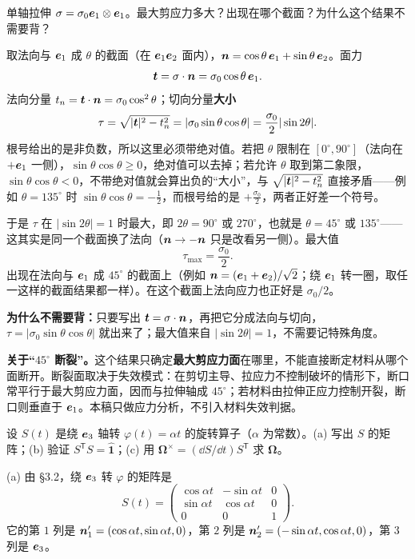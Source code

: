 \documentclass[11pt]{ctexart}
\newcommand{\ten}[1]{\mathbf{#1}}
\newcommand{\unitd}{\hat{\ten{1}}}
\begin{document}
{单轴拉伸 $\ten\sigma=\sigma_0\vect e_1\otimes\vect e_1$。最大剪应力多大？出现在哪个截面？为什么这个结果不需要背？}

取法向与 $\boldsymbol{e}_1$ 成 $\theta$ 的截面（在 $\boldsymbol{e}_1\boldsymbol{e}_2$ 面内），$\boldsymbol{n}=\cos\theta\,\boldsymbol{e}_1+\sin\theta\,\boldsymbol{e}_2$。面力
\[
\vect t=\ten\sigma\cdot\vect n=\sigma_0\cos\theta\,\vect e_1 .
\]
法向分量 $t_n=\boldsymbol{t}\cdot\boldsymbol{n}=\sigma_0\cos^2\theta$；切向分量\textbf{大小}
\[
\tau=\sqrt{|\boldsymbol{t}|^2-t_n^2}
=|\sigma_0\sin\theta\cos\theta|
=\frac{\sigma_0}{2}|\sin2\theta| .
\]
根号给出的是非负数，所以这里必须带绝对值。若把 $\theta$ 限制在 $[0^\circ,90^\circ]$（法向在 $+\boldsymbol{e}_1$ 一侧），$\sin\theta\cos\theta\ge0$，绝对值可以去掉；若允许 $\theta$ 取到第二象限，$\sin\theta\cos\theta<0$，不带绝对值就会算出负的“大小”，与 $\sqrt{|\boldsymbol{t}|^2-t_n^2}$ 直接矛盾——例如 $\theta=135^\circ$ 时 $\sin\theta\cos\theta=-\frac12$，而根号给的是 $+\frac{\sigma_0}{2}$，两者正好差一个符号。
\par\smallskip
于是 $\tau$ 在 $|\sin2\theta|=1$ 时最大，即 $2\theta=90^\circ$ 或 $270^\circ$，也就是 $\theta=45^\circ$ 或 $135^\circ$——这其实是同一个截面换了法向（$\boldsymbol{n}\to-\boldsymbol{n}$ 只是改看另一侧）。最大值
\[
\tau_{\max}=\frac{\sigma_0}{2}.
\]
出现在法向与 $\boldsymbol{e}_1$ 成 $45^\circ$ 的截面上（例如 $\boldsymbol{n}=(\boldsymbol{e}_1+\boldsymbol{e}_2)/\sqrt2$；绕 $\boldsymbol{e}_1$ 转一圈，取任一这样的截面结果都一样）。在这个截面上法向应力也正好是 $\sigma_0/2$。

\textbf{为什么不需要背：}只要写出 $\vect t=\ten\sigma\cdot\vect n$，再把它分成法向与切向，$\tau=|\sigma_0\sin\theta\cos\theta|$ 就出来了；最大值来自 $|\sin2\theta|=1$，不需要记特殊角度。

\textbf{关于“$45^\circ$ 断裂”。}这个结果只确定\textbf{最大剪应力面}在哪里，不能直接断定材料从哪个面断开。断裂面取决于失效模式：在剪切主导、拉应力不控制破坏的情形下，断口常平行于最大剪应力面，因而与拉伸轴成 $45^\circ$；若材料由拉伸正应力控制开裂，断口则垂直于 $\boldsymbol{e}_1$。本稿只做应力分析，不引入材料失效判据。

{设 $S(t)$ 是绕 $\boldsymbol{e}_3$ 轴转 $\varphi(t)=\alpha t$ 的旋转算子（$\alpha$ 为常数）。(a) 写出 $S$ 的矩阵；(b) 验证 $S^{\mathsf T}S=\unitd$；(c) 用 $\boldsymbol\Omega^{\times}=(\dd S/\dd t)S^{\mathsf T}$ 求 $\boldsymbol\Omega$。}

(a) 由 \S3.2，绕 $\boldsymbol{e}_3$ 转 $\varphi$ 的矩阵是
\[
S(t)=
\begin{pmatrix}
\cos\alpha t&-\sin\alpha t&0\\
\sin\alpha t&\cos\alpha t&0\\
0&0&1
\end{pmatrix}.
\]
它的第 $1$ 列是 $\boldsymbol{n}'_1=(\cos\alpha t,\sin\alpha t,0)$，第 $2$ 列是 $\boldsymbol{n}'_2=(-\sin\alpha t,\cos\alpha t,0)$，第 $3$ 列是 $\boldsymbol{e}_3$。
\end{document}
